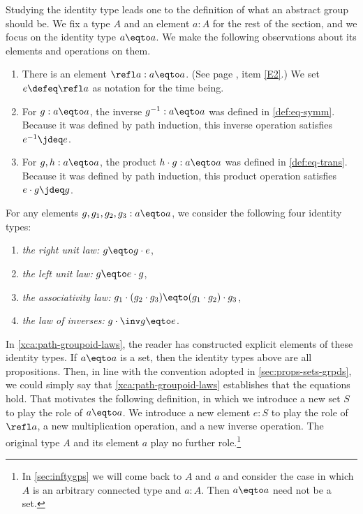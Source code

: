 Studying the identity type leads one to the definition of what an 
abstract group should be. We fix a type $A$ and an element $a:A$ for the rest
of the section, and we focus on the identity type $a\eqto a$.
We make the following observations about its elements and operations on them.

\begin{enumerate}
\item
  There is an element $\refl a : a \eqto a$.
  (See page \pageref{rules-for-equality}, item \ref{E2}.)
  We set $e \defeq \refl a$ as notation for the time being.
\item
  For $g : a \eqto a$, the inverse $g^{-1} : a \eqto a$ was defined in \cref{def:eq-symm}.
  Because it was defined by path induction, this inverse operation satisfies $e^{-1} \jdeq e$.
\item
  For $g, h : a \eqto a$, the product $h \cdot g : a \eqto a$ was defined in \cref{def:eq-trans}.
  Because it was defined by path induction, this product operation satisfies $e \cdot g \jdeq g$.
\end{enumerate}

For any elements $g,g_1,g_2,g_3:a\eqto a$, we consider the 
following four identity types:
\begin{enumerate}
\item
  \label{it:right-unit} \emph{the right unit law:} $g \eqto g\cdot e$,
\item
  \label{it:left-unit} \emph{the left unit law:} $g \eqto e\cdot g$,
\item
  \label{it:associativity} \emph{the associativity law:} $g_1\cdot(g_2\cdot g_3)
  \eqto (g_1\cdot g_2)\cdot g_3$,
\item
  \label{it:inverse} \emph{the law of inverses:} $g\cdot \inv g \eqto e$.
\end{enumerate}

In \cref{xca:path-groupoid-laws}, the reader has constructed explicit
elements of these identity types. 
If $a\eqto a$ is a set, then the identity types
above are all propositions. Then, in line with the convention adopted 
in \cref{sec:props-sets-grpds}, we could simply say that
\cref{xca:path-groupoid-laws} establishes that the equations hold.
That motivates the following definition, 
in which we introduce a new set $S$ to play the role of $a\eqto a$.
We introduce a new element $e:S$ to play the role of $\refl a$, 
a new multiplication operation, and a new inverse operation. 
The original type $A$ and its element $a$ play no further role.\footnote{%
In \cref{sec:inftygps} we will come back to $A$ and $a$ and
consider the case in which $A$ is an arbitrary connected type
and $a:A$. Then $a\eqto a$ need not be a set.}

